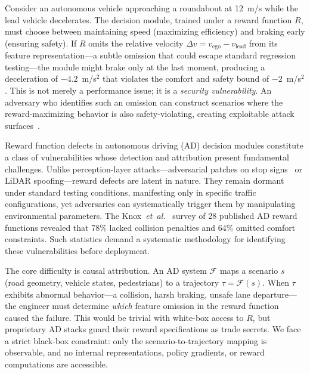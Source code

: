 \documentclass[journal]{IEEEtran}
\theoremstyle{plain}
\newcommand{\sys}{\mathcal{F}}
\begin{document}
Consider an autonomous vehicle approaching a roundabout at 12~m/s while the lead vehicle decelerates. The decision module, trained under a reward function $R$, must choose between maintaining speed (maximizing efficiency) and braking early (ensuring safety). If $R$ omits the relative velocity $\Delta v = v_{\text{ego}} - v_{\text{lead}}$ from its feature representation---a subtle omission that could escape standard regression testing---the module might brake only at the last moment, producing a deceleration of $-4.2$~m/s$^2$ that violates the comfort and safety bound of $-2$~m/s$^2$. This is not merely a performance issue; it is a \emph{security vulnerability}. An adversary who identifies such an omission can construct scenarios where the reward-maximizing behavior is also safety-violating, creating exploitable attack surfaces~\cite{white2023adversarial}.

Reward function defects in autonomous driving (AD) decision modules constitute a class of vulnerabilities whose detection and attribution present fundamental challenges. Unlike perception-layer attacks---adversarial patches on stop signs~\cite{goodfellow2015explaining} or LiDAR spoofing---reward defects are latent in nature. They remain dormant under standard testing conditions, manifesting only in specific traffic configurations, yet adversaries can systematically trigger them by manipulating environmental parameters. The Knox~\emph{et~al.}~\cite{knox2023reward} survey of 28 published AD reward functions revealed that 78\% lacked collision penalties and 64\% omitted comfort constraints. Such statistics demand a systematic methodology for identifying these vulnerabilities before deployment.

The core difficulty is causal attribution. An AD system $\sys$ maps a scenario $s$ (road geometry, vehicle states, pedestrians) to a trajectory $\tau = \sys(s)$. When $\tau$ exhibits abnormal behavior---a collision, harsh braking, unsafe lane departure---the engineer must determine \emph{which} feature omission in the reward function caused the failure. This would be trivial with white-box access to $R$, but proprietary AD stacks guard their reward specifications as trade secrets. We face a strict black-box constraint: only the scenario-to-trajectory mapping is observable, and no internal representations, policy gradients, or reward computations are accessible.
\end{document}
